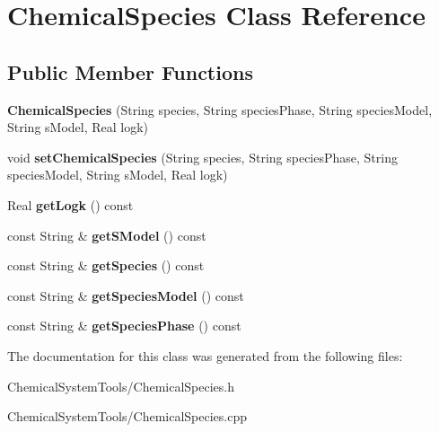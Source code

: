 \hypertarget{classChemicalSpecies}{
\section{ChemicalSpecies Class Reference}
\label{classChemicalSpecies}
}
\subsection*{Public Member Functions}
\begin{DoxyCompactItemize}
\item 
\hypertarget{classChemicalSpecies_a72ccba3bec44166dedc0b203b3528703}{
{\bfseries ChemicalSpecies} (String species, String speciesPhase, String speciesModel, String sModel, Real logk)}
\label{classChemicalSpecies_a72ccba3bec44166dedc0b203b3528703}

\item 
\hypertarget{classChemicalSpecies_a8f89b95c5f47214080cb18c8b4d542da}{
void {\bfseries setChemicalSpecies} (String species, String speciesPhase, String speciesModel, String sModel, Real logk)}
\label{classChemicalSpecies_a8f89b95c5f47214080cb18c8b4d542da}

\item 
\hypertarget{classChemicalSpecies_ab7ad83f095e2a4f1fc258ce2518f342a}{
Real {\bfseries getLogk} () const }
\label{classChemicalSpecies_ab7ad83f095e2a4f1fc258ce2518f342a}

\item 
\hypertarget{classChemicalSpecies_a60d41b98d78a8e9ef5daa6c9b32ae6b6}{
const String \& {\bfseries getSModel} () const }
\label{classChemicalSpecies_a60d41b98d78a8e9ef5daa6c9b32ae6b6}

\item 
\hypertarget{classChemicalSpecies_a970db2293bf68bfc277e2bfb9114dd8e}{
const String \& {\bfseries getSpecies} () const }
\label{classChemicalSpecies_a970db2293bf68bfc277e2bfb9114dd8e}

\item 
\hypertarget{classChemicalSpecies_a12fda065e554be6b54ff324939c5bd1b}{
const String \& {\bfseries getSpeciesModel} () const }
\label{classChemicalSpecies_a12fda065e554be6b54ff324939c5bd1b}

\item 
\hypertarget{classChemicalSpecies_a7a44f124badcf1ba81a0463a3cb04916}{
const String \& {\bfseries getSpeciesPhase} () const }
\label{classChemicalSpecies_a7a44f124badcf1ba81a0463a3cb04916}

\end{DoxyCompactItemize}


The documentation for this class was generated from the following files:\begin{DoxyCompactItemize}
\item 
ChemicalSystemTools/ChemicalSpecies.h\item 
ChemicalSystemTools/ChemicalSpecies.cpp\end{DoxyCompactItemize}
